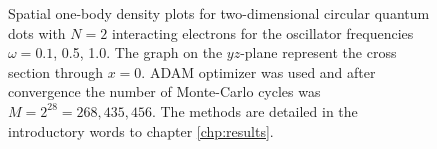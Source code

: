 \begin{landscape}
\begin{figure} [H]
		\caption{Spatial one-body density plots for two-dimensional circular quantum dots with $N=2$ interacting electrons for the oscillator frequencies $\omega=0.1$, 0.5, 1.0. The graph on the $yz$-plane represent the cross section through $x=0$. ADAM optimizer was used and after convergence the number of Monte-Carlo cycles was $M=2^{28}=268,435,456$. The methods are detailed in the introductory words to chapter \ref{chp:results}.}
		\label{fig:OB2_interaction_2P}
	\end{figure}
	\begin{figure} [H]%
		\centering
		\captionsetup[subfigure]{labelformat=empty}
		\captionsetup{width=0.9\hsize}
		\hspace{0.cm}
		\hspace{-0.0cm}
		\hspace{-0.0cm}
		\hspace{-0.0cm}
		\\ [-0.3cm]
		

\end{figure}
\end{landscape}
